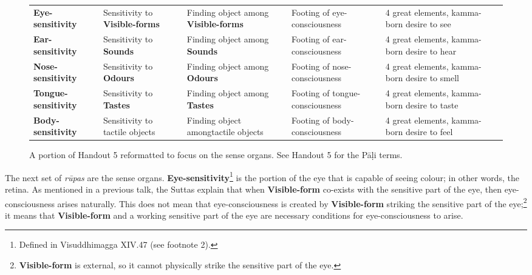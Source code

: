 \begin{figure} [H]
\setlength{\tabcolsep}{0pt}
\renewcommand{\arraystretch}{1.1}
\noindent\begin{tabular}{P{0.25\textwidth} | C{.185\textwidth} C{0.185\textwidth} C{0.185\textwidth} C{0.195\textwidth} m{0mm}}
\toprule
 &  &  &  & \\
\midrule
\textbf{Eye-sensitivity} & Sensitivity to \textbf{Visible-forms} & Finding object among \textbf{Visible-forms} & Footing of eye-consciousness & 4 great elements, kamma-born desire to see &\\[9mm]
\textbf{Ear-sensitivity} & Sensitivity to \textbf{Sounds} & Finding object among \textbf{Sounds} & Footing of ear-consciousness & 4 great elements, kamma-born desire to hear &\\[9mm]
\textbf{Nose-sensitivity} & Sensitivity to \textbf{Odours} & Finding object among \textbf{Odours} & Footing of nose-consciousness & 4 great elements, kamma-born desire to smell &\\[9mm]
\textbf{Tongue-sensitivity} & Sensitivity to \textbf{Tastes} & Finding object among \textbf{Tastes} & Footing of tongue-consciousness & 4 great elements, kamma-born desire to taste &\\[9mm]
\textbf{Body-sensitivity} & Sensitivity to tactile objects & Finding object among\newline tactile objects & Footing of body-consciousness & 4 great elements, kamma-born desire to feel &\\[9mm]
\bottomrule
\end{tabular}
\caption{A portion of Handout 5 reformatted to focus on the sense organs. See Handout 5 for the Pāḷi terms.}
\end{figure}

The next set of \textit{rūpas} are the sense organs. \textbf{Eye-sensitivity}\footnote{Defined in Visuddhimagga XIV.47 (see footnote 2).} is the portion of the eye that is capable of seeing colour; in other words, the retina. As mentioned in a previous talk, the Suttas explain that when \textbf{Visible-form} co-exists with the sensitive part of the eye, then eye-consciousness arises naturally. This does not mean that eye-consciousness is created by \textbf{Visible-form} striking the sensitive part of the eye;\footnote{\textbf{Visible-form} is external, so it cannot physically strike the sensitive part of the eye.} it means that \textbf{Visible-form} and a working sensitive part of the eye are necessary conditions for eye-consciousness to arise.

